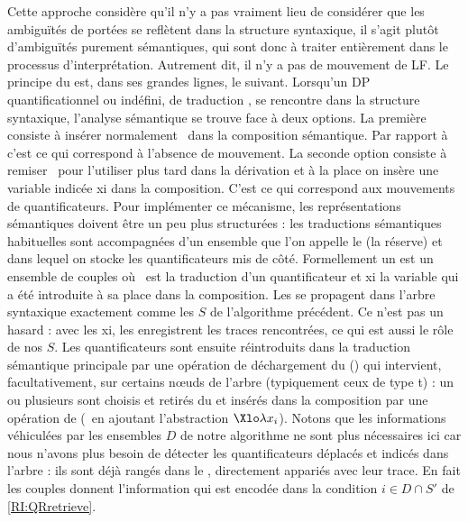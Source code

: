 Cette approche considère qu'il n'y a pas vraiment lieu de considérer que les ambiguïtés de portées se reflètent dans la structure syntaxique, il s'agit plutôt d'ambiguïtés purement sémantiques, qui sont donc à traiter entièrement dans le processus d'interprétation.  Autrement dit, il n'y a pas de mouvement de LF.  Le principe du  est, dans ses grandes lignes, le suivant.  Lorsqu'un DP quantificationnel ou indéfini, de traduction \vrb\alpha, se rencontre dans la structure syntaxique, l'analyse sémantique se trouve face à deux options.  La première consiste à insérer normalement \vrb\alpha\ dans la composition sémantique.
Par rapport à  c'est ce qui correspond à l'absence de mouvement.
La seconde option consiste à remiser \vrb\alpha\ pour l'utiliser plus tard dans la dérivation et à la place on insère une variable indicée \vrbi xi dans la composition.  C'est ce qui correspond aux mouvements de quantificateurs.
Pour implémenter ce mécanisme, les représentations sémantiques doivent être un peu plus structurées : les traductions sémantiques habituelles sont accompagnées d'un ensemble que l'on appelle le  (la réserve) et dans lequel on stocke les quantificateurs mis de côté.
Formellement un  est un ensemble de couples  où \vrb\alpha\ est la traduction d'un quantificateur et \vrbi xi la variable qui a été introduite à sa place dans la composition.  Les  se propagent dans l'arbre syntaxique exactement comme les $S$ de l'algorithme précédent.  Ce n'est pas un hasard : avec les \vrbi xi, les  enregistrent les traces rencontrées, ce qui est aussi le rôle de nos $S$.
Les quantificateurs sont ensuite réintroduits dans la traduction sémantique principale par une opération de déchargement du  () qui intervient, facultativement, sur certains n\oe uds de l'arbre (typiquement ceux de type \typ t) : un ou plusieurs  sont choisis et retirés du  et insérés dans la composition par une opération de  (\ie\ en ajoutant l'abstraction $\Xlo\lambda x_i$). 
Notons que les informations véhiculées par les ensembles $D$ de notre algorithme ne sont plus nécessaires ici car nous n'avons plus besoin de détecter les quantificateurs déplacés et indicés dans l'arbre : ils sont déjà rangés dans le , directement appariés avec leur trace. 
En fait les couples  donnent l'information qui est encodée dans la condition $i\in D\cap S'$ de \ref{RI:QRretrieve}.

